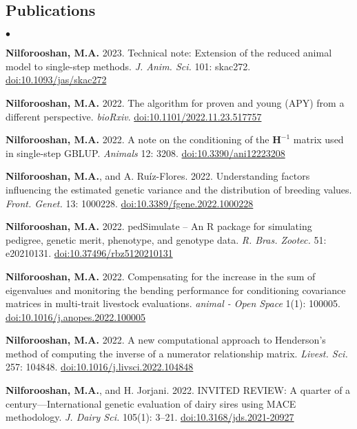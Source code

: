 \documentclass[margin,line]{res}
\newenvironment{list2}{
  \begin{list}{$\bullet$}{%
      \setlength{\itemsep}{0in}
      \setlength{\parsep}{0in} \setlength{\parskip}{0in}
      \setlength{\topsep}{0in} \setlength{\partopsep}{0in}
      \setlength{\leftmargin}{0.2in}}}{\end{list}}
\begin{document}
\begin{resume}
\section{\sc Publications}

\begin{list2}
\item {\bf Nilforooshan, M.A.} 2023. Technical note: Extension of the reduced animal model to single-step methods. {\em J. Anim. Sci.} 101: skac272. \href{https://doi.org/10.1093/jas/skac272}{doi:10.1093/jas/skac272}
\item {\bf Nilforooshan, M.A.} 2022. The algorithm for proven and young (APY) from a different perspective. {\em bioRxiv}. \href{https://doi.org/10.1101/2022.11.23.517757}{doi:10.1101/2022.11.23.517757}
\item {\bf Nilforooshan, M.A.} 2022. A note on the conditioning of the $\mathbf H^{-1}$ matrix used in single-step GBLUP. {\em Animals} 12: 3208. \href{https://doi.org/10.3390/ani12223208}{doi:10.3390/ani12223208}
\item {\bf Nilforooshan, M.A.}, and A. Ru\'{i}z-Flores. 2022. Understanding factors influencing the estimated genetic variance and the distribution of breeding values. {\em Front. Genet.} 13: 1000228. \href{https://doi.org/10.3389/fgene.2022.1000228}{doi:10.3389/fgene.2022.1000228}
\item {\bf Nilforooshan, M.A.} 2022. pedSimulate -- An R package for simulating pedigree, genetic merit, phenotype, and genotype data. {\em R. Bras. Zootec.} 51: e20210131. \href{https://doi.org/10.37496/rbz5120210131}{doi:10.37496/rbz5120210131}
\item {\bf Nilforooshan, M.A.} 2022. Compensating for the increase in the sum of eigenvalues and monitoring the bending performance for conditioning covariance matrices in multi-trait livestock evaluations. {\em animal - Open Space} 1(1): 100005. \href{https://doi.org/10.1016/j.anopes.2022.100005}{doi:10.1016/j.anopes.2022.100005}
\item {\bf Nilforooshan, M.A.} 2022. A new computational approach to Henderson's method of computing the inverse of a numerator relationship matrix. {\em Livest. Sci.} 257: 104848. \href{https://doi.org/10.1016/j.livsci.2022.104848}{doi:10.1016/j.livsci.2022.104848}
\item {\bf Nilforooshan, M.A.}, and H. Jorjani. 2022. INVITED REVIEW: A quarter of a century---International genetic evaluation of dairy sires using MACE methodology. {\em J. Dairy Sci.} 105(1): 3--21. \href{https://doi.org/10.3168/jds.2021-20927}{doi:10.3168/jds.2021-20927}

\end{list2}
\end{resume}
\end{document}
